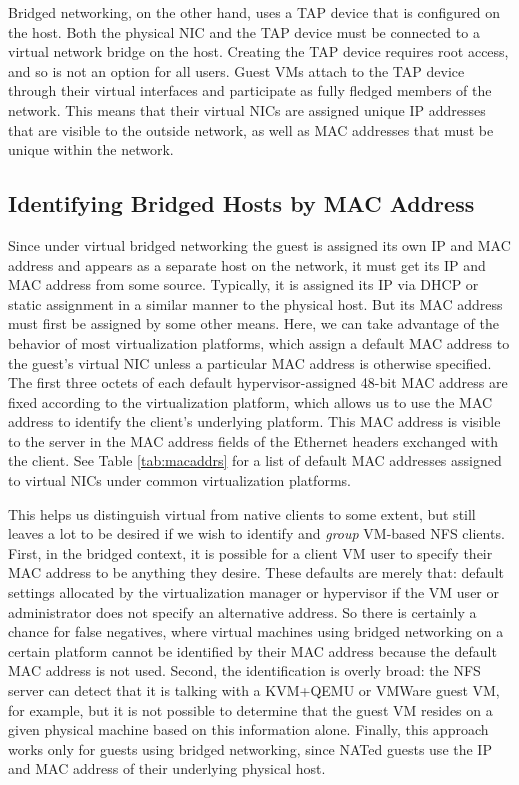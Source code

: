\documentclass[letterpaper,twocolumn,11pt]{article}
\begin{document}
Bridged networking, on the other hand, uses a TAP device that is configured on the host. Both the physical NIC and the TAP device must be connected to a virtual network bridge on the host. Creating the TAP device requires root access, and so is not an option for all users. Guest VMs attach to the TAP device through their virtual interfaces and participate as fully fledged members of the network. This means that their virtual NICs are assigned unique IP addresses that are visible to the outside network, as well as MAC addresses that must be unique within the network.

\subsection{Identifying Bridged Hosts by MAC Address}
\label{subsec:macaddrs}
Since under virtual bridged networking the guest is assigned its own IP and MAC address and appears as a separate host on the network, it must get its IP and MAC address from some source. Typically, it is assigned its IP via DHCP or static assignment in a similar manner to the physical host. But its MAC address must first be assigned by some other means. Here, we can take advantage of the behavior of most virtualization platforms, which assign a default MAC address to the guest's virtual NIC unless a particular MAC address is otherwise specified. The first three octets of each default hypervisor-assigned 48-bit MAC address are fixed according to the virtualization platform, which allows us to use the MAC address to identify the client's underlying platform. This MAC address is visible to the server in the MAC address fields of the Ethernet headers exchanged with the client. See Table \ref{tab:macaddrs} for a list of default MAC addresses assigned to virtual NICs under common virtualization platforms. 

This helps us distinguish virtual from native clients to some extent, but still leaves a lot to be desired if we wish to identify and \emph{group} VM-based NFS clients. First, in the bridged context, it is possible for a client VM user to specify their MAC address to be anything they desire. These defaults are merely that: default settings allocated by the virtualization manager or hypervisor if the VM user or administrator does not specify an alternative address. So there is certainly a chance for false negatives, where virtual machines using bridged networking on a certain platform cannot be identified by their MAC address because the default MAC address is not used. Second, the identification is overly broad: the NFS server can detect that it is talking with a KVM+QEMU or VMWare guest VM, for example, but it is not possible to determine that the guest VM resides on a given physical machine based on this information alone. Finally, this approach works only for guests using bridged networking, since NATed guests use the IP and MAC address of their underlying physical host.
\end{document}
